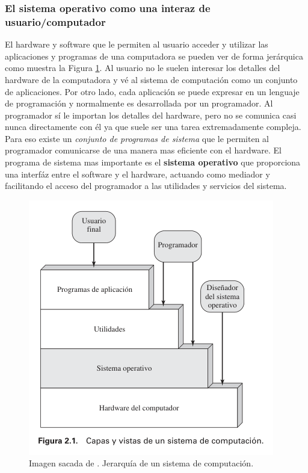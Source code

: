\documentclass[12pt]{article}
\begin{document}
  \subsubsection{El sistema operativo como una interaz de usuario/computador}
  El hardware y software que le permiten al usuario acceder y utilizar las aplicaciones y programas de una computadora se pueden ver de forma jerárquica como muestra la Figura \ref{fig:jerarquia-sist-comp}. Al usuario no le suelen interesar los detalles del hardware de la computadora y vé al sistema de computación como un conjunto de aplicaciones. Por otro lado, cada aplicación se puede expresar en un lenguaje de programación y normalmente es desarrollada por un programador. Al programador sí le importan los detalles del hardware, pero no se comunica casi nunca directamente con él ya que suele ser una tarea extremadamente compleja. Para eso existe un \textit{conjunto de programas de sistema} que le permiten al programador comunicarse de una manera mas eficiente con el hardware. El programa de sistema mas importante es el \textbf{sistema operativo} que proporciona una interfáz entre el software y el hardware, actuando como mediador y facilitando el acceso del programador a las utilidades y servicios del sistema.

  \begin{figure}[H]
    \centering
\includegraphics[width=0.4\linewidth]{imagenes/jerarquia-sist-comp.png}
    \caption{Imagen sacada de \parencite{sostallings}. Jerarquía de un sistema de computación.}
    \label{fig:jerarquia-sist-comp}
  \end{figure}
\end{document}
